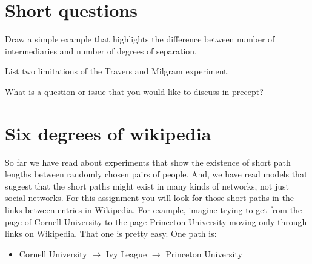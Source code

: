 \documentclass[addpoints]{exam}
\begin{document}
\begin{center}
\end{center}


\section{Short questions}

\begin{questions}
\question[8] Draw a simple example that highlights the difference between number of intermediaries and number of degrees of separation.

\vspace{1in}

\question[4] List two limitations of the Travers and Milgram experiment.

\vspace{1.5in}



\question[12] What is a question or issue that you would like to discuss in precept?

\vspace{1in}

\end{questions}


\section{Six degrees of wikipedia}

So far we have read about experiments that show the existence of short path lengths between randomly chosen pairs of people.  And, we have read models that suggest that the short paths might exist in many kinds of networks, not just social networks.  For this assignment you will look for those short paths in the links between entries in Wikipedia.  For example, imagine trying to get from the page of Cornell University to the page Princeton University moving only through links on Wikipedia.  That one is pretty easy.  One path is:
\begin{itemize}
\item Cornell University $\rightarrow$ Ivy League $\rightarrow$ Princeton University
\end{itemize}
\end{document}
